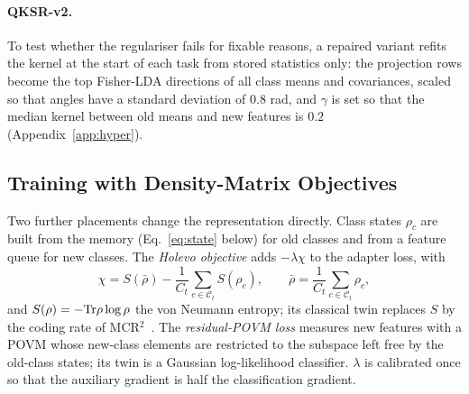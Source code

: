 \paragraph{QKSR-v2.}
To test whether the regulariser fails for fixable reasons, a repaired variant
refits the kernel at the start of each task from stored statistics only: the
projection rows become the top Fisher-LDA directions of all class means and
covariances, scaled so that angles have a standard deviation of $0.8$ rad, and
$\gamma$ is set so that the median kernel between old means and new features
is $0.2$ (Appendix~\ref{app:hyper}).

\subsection{Training with Density-Matrix Objectives}
\label{sec:holevo}
Two further placements change the representation directly. Class states
$\rho_c$ are built from the memory (Eq.~\ref{eq:state} below) for old classes
and from a feature queue for new classes. The \emph{Holevo objective} adds
$-\lambda\chi$ to the adapter loss, with
\begin{equation}
  \chi=S(\bar\rho)-\frac1{C_t}\sum_{c\in\mathcal C_t}S(\rho_c),\qquad
  \bar\rho=\frac1{C_t}\sum_{c\in\mathcal C_t}\rho_c,
  \label{eq:holevo}
\end{equation}
and $S(\rho)=-\mathrm{Tr}\rho\log\rho$ the von Neumann entropy; its classical twin replaces $S$ by the coding rate of MCR$^2$~\citep{wu2021rate}.
The \emph{residual-POVM loss} measures new features with a POVM whose new-class
elements are restricted to the subspace left free by the old-class states;
its twin is a Gaussian log-likelihood classifier. $\lambda$ is calibrated once
so that the auxiliary gradient is half the classification gradient.

